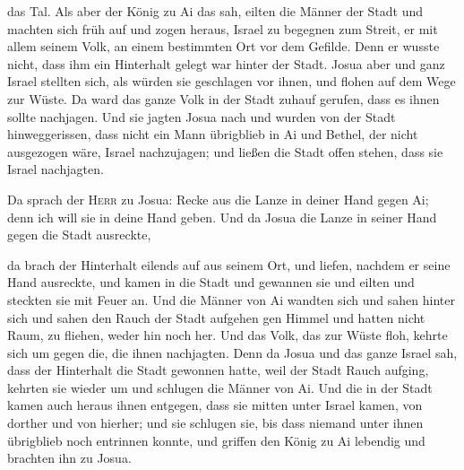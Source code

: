 das Tal.  Als aber der König zu Ai das sah, eilten die
Männer der Stadt und machten sich früh auf und zogen heraus, Israel zu
begegnen zum Streit, er mit allem seinem Volk, an einem bestimmten Ort
vor dem Gefilde. Denn er wusste nicht, dass ihm ein Hinterhalt gelegt
war hinter der Stadt.  Josua aber und ganz Israel
stellten sich, als würden sie geschlagen vor ihnen, und flohen auf dem
Wege zur Wüste.  Da ward das ganze Volk in der Stadt
zuhauf gerufen, dass es ihnen sollte nachjagen.  Und sie
jagten Josua nach und wurden von der Stadt hinweggerissen, dass nicht
ein Mann übrigblieb in Ai und Bethel, der nicht ausgezogen wäre, Israel
nachzujagen; und ließen die Stadt offen stehen, dass sie Israel
nachjagten.

 Da sprach der \textsc{Herr} zu Josua: Recke aus die
Lanze in deiner Hand gegen Ai; denn ich will sie in deine Hand geben.
Und da Josua die Lanze in seiner Hand gegen die Stadt ausreckte,

 da brach der Hinterhalt eilends auf aus seinem Ort, und
liefen, nachdem er seine Hand ausreckte, und kamen in die Stadt und
gewannen sie und eilten und steckten sie mit Feuer an. 
Und die Männer von Ai wandten sich und sahen hinter sich und sahen den
Rauch der Stadt aufgehen gen Himmel und hatten nicht Raum, zu fliehen,
weder hin noch her. Und das Volk, das zur Wüste floh, kehrte sich um
gegen die, die ihnen nachjagten.  Denn da Josua und das
ganze Israel sah, dass der Hinterhalt die Stadt gewonnen hatte, weil der
Stadt Rauch aufging, kehrten sie wieder um und schlugen die Männer von
Ai.  Und die in der Stadt kamen auch heraus ihnen
entgegen, dass sie mitten unter Israel kamen, von dorther und von
hierher; und sie schlugen sie, bis dass niemand unter ihnen übrigblieb
noch entrinnen konnte,  und griffen den König zu Ai
lebendig und brachten ihn zu Josua.

